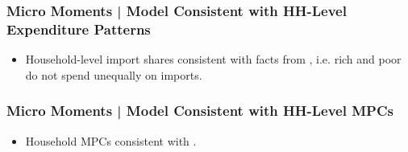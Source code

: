 \documentclass[9pt,pdftex,aspectratio=1610]{beamer}
\theoremstyle{definition}
\begin{document}
\begin{frame}[t]
\frametitle{Micro Moments | Model Consistent with HH-Level Expenditure Patterns}
\begin{figure}[!t]
\end{figure}
\begin{itemize}
\smallskip
\item Household-level import shares consistent with facts from  \citet{borusyak2021distributional}, i.e. rich and poor do not spend unequally on imports.
\end{itemize}
\end{frame}

\begin{frame}[t]
\frametitle{Micro Moments | Model Consistent with HH-Level MPCs}
\begin{figure}[!t]
\end{figure}
\begin{itemize}
\smallskip
\item Household MPCs consistent with \citet{kaplan2022marginal}.
\end{itemize}
\end{frame}
\end{document}
